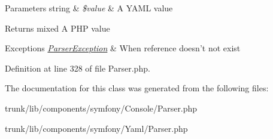 \begin{DoxyParams}[1]{Parameters}
string & {\em \$value} & A YAML value\\
\hline
\end{DoxyParams}
\begin{DoxyReturn}{Returns}
mixed A PHP value
\end{DoxyReturn}

\begin{DoxyExceptions}{Exceptions}
{\em \hyperlink{class_symfony_1_1_components_1_1_yaml_1_1_parser_exception}{ParserException}} & When reference doesn't not exist \\
\hline
\end{DoxyExceptions}


Definition at line 328 of file Parser.php.



The documentation for this class was generated from the following files:\begin{DoxyCompactItemize}
\item 
trunk/lib/components/symfony/Console/Parser.php\item 
trunk/lib/components/symfony/Yaml/Parser.php\end{DoxyCompactItemize}
